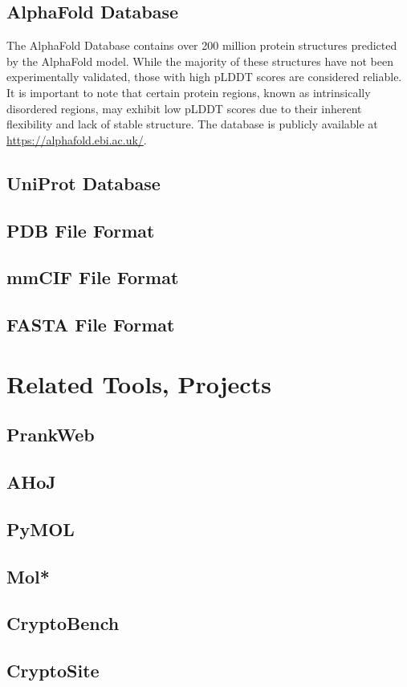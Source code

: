 \subsection{AlphaFold Database}
\label{sec:alphafold-db}

The AlphaFold Database \cite{varadi2024alphafold} contains over 200 million protein structures predicted by the AlphaFold model. While the majority of these structures have not been experimentally validated, those with high pLDDT scores are considered reliable. It is important to note that certain protein regions, known as intrinsically disordered regions, may exhibit low pLDDT scores due to their inherent flexibility and lack of stable structure. The database is publicly available at \url{https://alphafold.ebi.ac.uk/}.

\subsection{UniProt Database}
\label{sec:uniprot-db}

\subsection{PDB File Format}
\label{sec:pdb-format}

\subsection{mmCIF File Format}
\label{sec:mmcif-format}

\subsection{FASTA File Format}
\label{sec:fasta-format}

\section{Related Tools, Projects}
\label{sec:related-tools}

\subsection{PrankWeb}
\label{sec:prankweb}

\subsection{AHoJ}
\label{sec:ahoj}

\subsection{PyMOL}
\label{sec:pymol}

\subsection{Mol*}
\label{sec:molstar}

\subsection{CryptoBench}
\label{sec:cryptobench}

\subsection{CryptoSite}
\label{sec:cryptosite}

